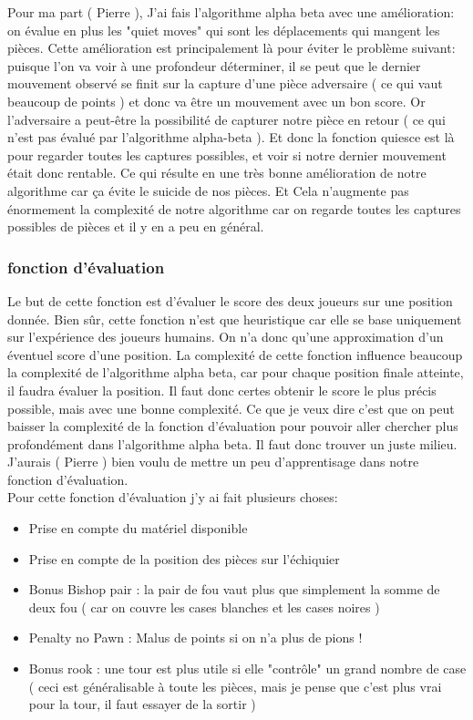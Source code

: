 \documentclass{article}
\begin{document}
Pour ma part ( Pierre ), J'ai fais l'algorithme alpha beta avec une amélioration: on évalue en plus les "quiet moves" qui sont les déplacements qui mangent les pièces.
Cette amélioration est principalement là pour éviter le problème suivant: puisque l'on va voir à une profondeur déterminer, il se peut que le dernier mouvement observé se finit sur la capture d'une pièce adversaire ( ce qui vaut beaucoup de points ) et donc va être un mouvement avec un bon score. Or l'adversaire a peut-être la possibilité de capturer notre pièce en retour ( ce qui n'est pas évalué par l'algorithme alpha-beta ). Et donc la fonction quiesce est là pour regarder toutes les captures possibles, et voir si notre dernier mouvement était donc rentable. Ce qui résulte en une très bonne amélioration de notre algorithme car ça évite le suicide de nos pièces. Et Cela n'augmente pas énormement la complexité de notre algorithme car on regarde toutes les captures possibles de pièces et il y en a peu en général.

\subsubsection{fonction d'évaluation}
Le but de cette fonction est d'évaluer le score des deux joueurs sur une position donnée.
Bien sûr, cette fonction n'est que heuristique car elle se base uniquement sur l'expérience des joueurs humains. On n'a donc qu'une approximation d'un éventuel score d'une position.
La complexité de cette fonction influence beaucoup la complexité de l'algorithme alpha beta, car pour chaque position finale atteinte, il faudra évaluer la position.
Il faut donc certes obtenir le score le plus précis possible, mais avec une bonne complexité. Ce que je veux dire c'est que on peut baisser la complexité de la fonction d'évaluation pour pouvoir aller chercher plus profondément dans l'algorithme alpha beta. Il faut donc trouver un juste milieu. \\
J'aurais ( Pierre ) bien voulu de mettre un peu d'apprentisage dans notre fonction d'évaluation. \\

Pour cette fonction d'évaluation j'y ai fait plusieurs choses:
\begin{itemize}
    \item Prise en compte du matériel disponible
    \item Prise en compte de la position des pièces sur l'échiquier
    \item Bonus Bishop pair : la pair de fou vaut plus que simplement la somme de deux fou ( car on couvre les cases blanches et les cases noires )
    \item Penalty no Pawn : Malus de points si on n'a plus de pions !
    \item Bonus rook : une tour est plus utile si elle "contrôle" un grand nombre de case ( ceci est généralisable à toute les pièces, mais je pense que c'est plus vrai pour la tour, il faut essayer de la sortir )
\end{itemize}
\end{document}
